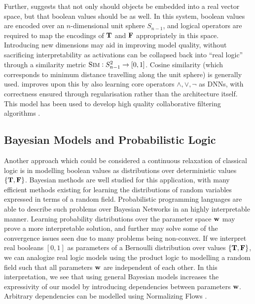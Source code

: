 Further, \cite{embeddedgoogle} suggests that not only should objects be embedded into a real vector space, but that boolean values should be as well. In this system, boolean values are encoded over an $n$-dimensional unit sphere $S_{n-1}$, and logical operators are required to map the encodings of $\textbf{T}$ and $\textbf{F}$ appropriately in this space. Introducing new dimensions may aid in improving model quality, without sacrificing interpretability as activations can be collapsed back into ``real logic'' through a similarity metric $\textsc{Sim}:S_{n-1}^2 \to [0,1]$. Cosine similarity (which corresponds to minimum distance travelling along the unit sphere) is generally used. \cite{embeddedlogicreg} improves upon this by also learning core operators $\land, \lor, \lnot$ as DNNs, with correctness ensured through regularisation rather than the architecture itself. This model has been used to develop high quality collaborative filtering algorithms \cite{embeddedcollabreasoning}.

\subsection{Bayesian Models and Probabilistic Logic}

Another approach which could be considered a continuous relaxation of classical logic is in modelling boolean values as distributions over deterministic values $\{\textbf{T}, \textbf{F}\}$. Bayesian methods are well studied for this application, with many efficient methods existing for learning the distributions of random variables expressed in terms of a random field. Probabilistic programming languages \cite{gordon2014probabilistic} are able to describe such problems over Bayesian Networks in an highly interpretable manner. Learning probability distributions over the parameter space $\mathbf{w}$ may prove a more interpretable solution, and further may solve some of the convergence issues seen due to many problems being non-convex. If we interpret real booleans $[0,1]$ as parameters of a Bernoulli distribution over values $\{\textbf{T}, \textbf{F}\}$, we can analogize real logic models using the product logic to modelling a random field such that all parameters $\mathbf{w}$ are independent of each other. In this interpretation, we see that using general Bayesian models increases the expressivity of our model by introducing dependencies between parameters $\mathbf{w}$. Arbitrary dependencies can be modelled using Normalizing Flows \cite{normalizingflows}.

